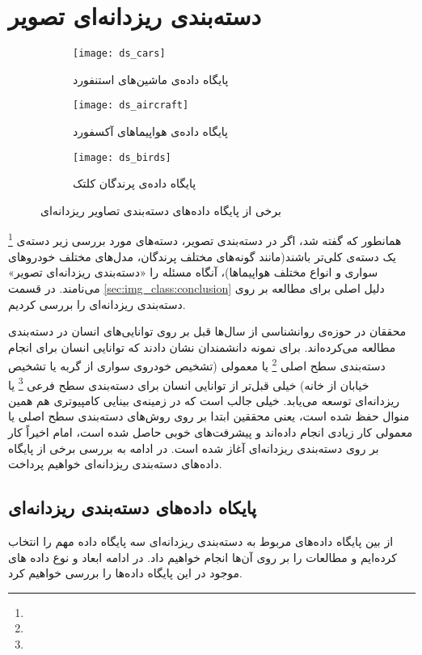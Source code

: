 \documentclass[11pt]{article}
\begin{document}
\section{دسته‌بندی ریزدانه‌ای تصویر}\label{sec:fg_class}
\begin{figure}[t!]
	\centering
	\begin{subfigure}[h]{0.5\textwidth}
		\centering
		\texttt{[image: ds\_cars]}
		\caption{پایگاه داده‌ی ماشین‌های استنفورد}
		\label{fig:fg_class:ds:cars}
	\end{subfigure}
	\begin{subfigure}[h]{0.5\textwidth}
		\centering
		\texttt{[image: ds\_aircraft]}
		\caption{پایگاه داده‌ی هواپیماهای آکسفورد}
		\label{fig:fg_class:ds:aircraft}
	\end{subfigure}
	\begin{subfigure}[h]{0.5\textwidth}
		\centering
		\texttt{[image: ds\_birds]}
		\caption{پایگاه داده‌ی پرندگان کلتک}
		\label{fig:fg_class:ds:birds}
	\end{subfigure}
	\caption{برخی از پایگاه داده‌های دسته‌بندی تصاویر ریزدانه‌ای}
	\label{fig:fg_class:ds}
\end{figure}
همانطور که گفته شد، اگر در دسته‌بندی تصویر، دسته‌های مورد بررسی زیر دسته‌ی
\footnote{}
یک دسته‌ی کلی‌تر باشند(مانند گونه‌های مختلف پرندگان، مدل‌های مختلف خودروهای سواری و انواع مختلف هواپیماها)، آنگاه مسئله را «دسته‌بندی ریزدانه‌ای تصویر»
می‌نامند. در قسمت
\ref{sec:img_class:conclusion}
دلیل اصلی برای مطالعه بر روی دسته‌بندی ریزدانه‌ای را بررسی کردیم.

محققان در حوزه‌ی روانشناسی از سال‌ها قبل بر روی توانایی‌های انسان در دسته‌بندی مطالعه می‌کرده‌اند. برای نمونه دانشمندان نشان دادند
\cite{johnson1998}
که توانایی انسان برای انجام دسته‌بندی سطح اصلی
\footnote{}
یا معمولی (تشخیص خودروی سواری از گربه یا تشخیص خیابان از خانه) خیلی قبل‌تر از توانایی انسان برای دسته‌بندی سطح فرعی
\footnote{}
یا ریزدانه‌ای توسعه می‌یابد. خیلی جالب است که در زمینه‌ی بینایی کامپیوتری هم همین منوال حفظ شده است، یعنی محققین ابتدا بر روی روش‌های دسته‌بندی سطح اصلی یا معمولی کار زیادی انجام داده‌اند و پیشرفت‌های خوبی حاصل شده است، امام اخیراً کار بر روی دسته‌بندی ریزدانه‌ای آغاز شده است. در ادامه به بررسی برخی از پایگاه داده‌های دسته‌بندی ریزدانه‌ای خواهیم پرداخت.

\subsection{پایکاه داده‌های دسته‌بندی ریزدانه‌ای}\label{sec:fg_class:datasets}
از بین پایگاه داده‌های مربوط به دسته‌بندی ریزدانه‌ای سه پایگاه داده مهم را انتخاب کرده‌ایم و مطالعات را بر روی آن‌ها انجام خواهیم داد. در ادامه ابعاد و نوع داده های موجود در این پایگاه داده‌ها را بررسی خواهیم کرد.
\end{document}
